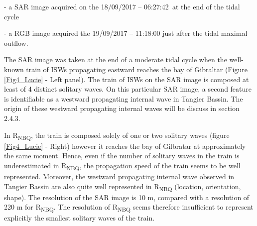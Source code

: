 - a SAR image acquired on the 18/09/2017 – 06:27:42\textit{\  }at the end of the tidal cycle\par

- a RGB image acquired \textit{ }the 19/09/2017 – 11:18:00 just after the tidal maximal outflow. \par


\vspace{\baselineskip}
The SAR image was taken at the end of a moderate tidal cycle when the well-known train of ISWs propagating eastward reaches the bay of Gibraltar (Figure \ref{Fig4_Lucie} - Left panel). The train of ISWs on the SAR image is composed at least of 4 distinct solitary waves. On this particular SAR image, a second feature is identifiable as a westward propagating internal wave in Tangier Bassin. The origin of these westward propagating internal waves will be discuss in section 2.4.3.\par

\vspace{\baselineskip}
In R\textsubscript{NBQ}, the train is composed solely of one or two solitary waves (figure \ref{Fig4_Lucie} - Right) however it reaches the bay of Gilbratar at approximately the same moment. Hence, even if the number of solitary waves in the train is underestimated in R\textsubscript{NBQ}, the propagation speed of the train seems to be well represented. Moreover, the westward propagating internal wave observed in Tangier Bassin are also quite well represented in R\textsubscript{NBQ} (location, orientation, shape). The resolution of the SAR image is 10 m, compared with a resolution of 220 m for R\textsubscript{NBQ}. The resolution of R\textsubscript{NBQ} seems therefore insufficient to represent explicitly the smallest solitary waves of the train. 
\par


